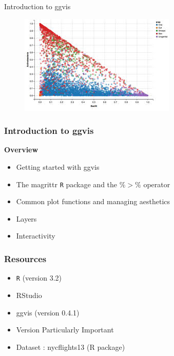 \documentclass{beamer}
\begin{document}
\begin{frame}
	\Huge
Introduction to ggvis

\begin{figure}
\centering
\includegraphics[width=0.8\linewidth]{ggvis1}
\end{figure}

\end{frame}
\begin{frame}
\frametitle{Introduction to ggvis}
\LARGE
\textbf{Overview}
\begin{itemize}
\item Getting started with ggvis
\item The magrittr \texttt{R} package and the $\%>\% $ operator
\item Common plot functions and managing aesthetics
\item Layers
\item Interactivity 
\end{itemize}
\end{frame}
\begin{frame}
\frametitle{Resources}
\LARGE

\begin{itemize}
\item \texttt{R} (version 3.2)
\item RStudio
\item ggvis (version 0.4.1)
\item Version Particularly Important
\item Dataset : nycflights13 (R package)
\end{itemize}

\end{frame}
\end{document}
